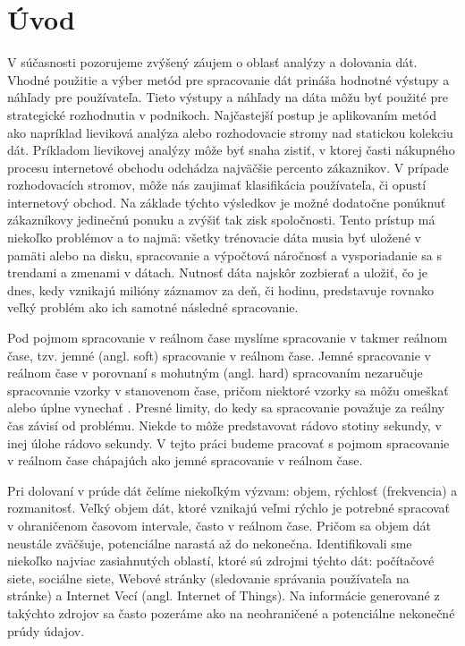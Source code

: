 
\chapter{Úvod}
V súčasnosti pozorujeme zvýšený záujem o oblasť analýzy a dolovania dát. Vhodné použitie a výber metód pre spracovanie dát prináša hodnotné výstupy a náhľady pre používateľa. Tieto výstupy a náhľady na dáta môžu byť použité pre strategické rozhodnutia v podnikoch. Najčastejší postup je aplikovaním metód ako napríklad lieviková analýza alebo rozhodovacie stromy nad statickou kolekciu dát. Príkladom lievikovej analýzy môže byť snaha zistiť, v ktorej časti nákupného procesu internetové obchodu odchádza najväčšie percento zákaznikov. V prípade rozhodovacích stromov, môže nás zaujimať klasifikácia používateľa, či opustí internetový obchod. Na základe týchto výsledkov je možné dodatočne ponúknuť zákazníkovy jedinečnú ponuku a zvýšiť tak zisk spoločnosti. Tento prístup má niekoľko problémov a to najmä: všetky trénovacie dáta musia byť uložené v pamäti alebo na disku, spracovanie a výpočtová náročnosť a vysporiadanie sa s trendami a zmenami v dátach. Nutnosť dáta najskôr zozbierať a uložiť, čo je dnes, kedy vznikajú milióny záznamov za deň, či hodinu, predstavuje rovnako veľký problém ako ich samotné následné spracovanie.
\par
Pod pojmom spracovanie v reálnom čase myslíme spracovanie v takmer reálnom čase, tzv. jemné (angl. soft) spracovanie v reálnom čase. Jemné spracovanie v reálnom čase v porovnaní s mohutným (angl. hard) spracovaním nezaručuje spracovanie vzorky v stanovenom čase, pričom niektoré vzorky sa môžu omeškať alebo úplne vynechať \citep{stankovic1988real}. Presné limity, do kedy sa spracovanie považuje za reálny čas závisí od problému. Niekde to môže predstavovat rádovo stotiny sekundy, v inej úlohe rádovo sekundy. V tejto práci budeme pracovať s pojmom spracovanie v reálnom čase chápajúch ako jemné spracovanie v reálnom čase.
\par
Pri dolovaní v prúde dát čelíme niekoľkým výzvam: objem,  rýchlosť (frekvencia) a rozmanitosť. Veľký objem dát, ktoré vznikajú veľmi rýchlo je potrebné spracovať v ohraničenom časovom intervale, často v reálnom čase. Pričom sa objem dát neustále zväčšuje, potenciálne narastá až do nekonečna. Identifikovali sme niekoľko najviac zasiahnutých oblastí, ktoré sú zdrojmi týchto dát: počítačové siete, sociálne siete, Webové stránky (sledovanie správania používateľa na stránke) a Internet Vecí (angl. Internet of Things). Na informácie generované z takýchto zdrojov sa často pozeráme ako na neohraničené a potenciálne nekonečné prúdy údajov.
